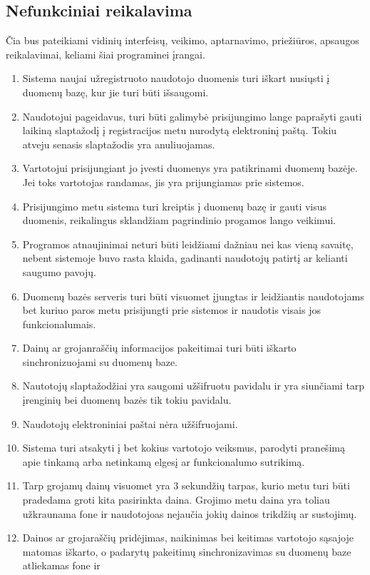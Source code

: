 \documentclass{VUMIFPSkursinis}
\begin{document}
\subsection{Nefunkciniai reikalavima}
Čia bus pateikiami vidinių interfeisų, veikimo, aptarnavimo, priežiūros, apsaugos reikalavimai, keliami šiai programinei įrangai.

\begin{enumerate}[start=1,label={\bfseries NFR\arabic*}]
\item Sistema naujai užregistruoto naudotojo duomenis turi iškart nusiųsti į duomenų bazę, kur jie turi būti išsaugomi.
\item Naudotojui pageidavus, turi būti galimybė prisijungimo lange paprašyti gauti laikiną slaptažodį į registracijos metu nurodytą elektroninį paštą. Tokiu atveju senasis slaptažodis yra anuliuojamas.
\item Vartotojui prisijungiant jo įvesti duomenys yra patikrinami duomenų bazėje. Jei toks vartotojas randamas, jis yra prijungiamas prie sistemos.
\item Prisijungimo metu sistema turi kreiptis į duomenų bazę ir gauti visus duomenis, reikalingus sklandžiam pagrindinio progamos lango veikimui.
\item Programos atnaujinimai neturi būti leidžiami dažniau nei kas vieną savaitę, nebent sistemoje buvo rasta klaida, gadinanti naudotojų patirtį ar kelianti saugumo pavojų.
\item Duomenų bazės serveris turi būti visuomet įjungtas ir leidžiantis naudotojams bet kuriuo paros metu prisijungti prie sistemos ir naudotis visais jos funkcionalumais. 
\item Dainų ar grojanraščių informacijos pakeitimai turi būti iškarto sinchronizuojami su duomenų baze.
\item Nautotojų slaptažodžiai yra saugomi užšifruotu pavidalu ir yra siunčiami tarp įrenginių bei duomenų bazės tik tokiu pavidalu.
\item Naudotojų elektroniniai paštai nėra užšifruojami.
\item Sistema turi atsakyti į bet kokius vartotojo veiksmus, parodyti pranešimą apie tinkamą arba netinkamą elgesį ar funkcionalumo sutrikimą. 
\item Tarp grojamų dainų visuomet yra 3 sekundžių tarpas, kurio metu turi būti pradedama groti kita pasirinkta daina. Grojimo metu daina yra toliau užkraunama fone ir naudotojoas 
nejaučia jokių dainos trikdžių ar sustojimų.
\item Dainos ar grojaraščių pridėjimas, naikinimas bei keitimas vartotojo sąsajoje matomas iškarto, o padarytų pakeitimų sinchronizavimas su duomenų baze atliekamas fone ir 

\end{enumerate}
\end{document}
